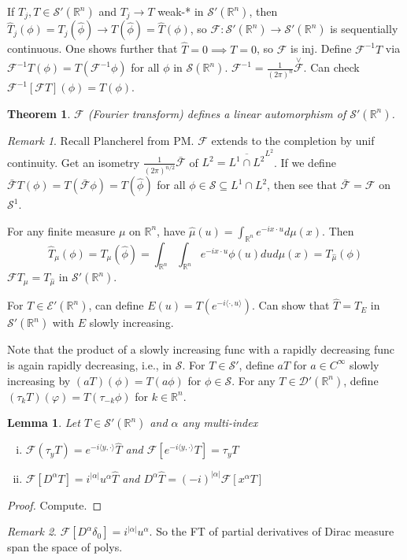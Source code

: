 \documentclass{article}
\theoremstyle{definition}
\theoremstyle{remark}
\newtheorem{rem}{Remark}
\theoremstyle{plain}
\newtheorem{lem}[defn]{Lemma}
\newtheorem{thm}[defn]{Theorem}
\newcommand{\RR}{\mathbb{R}}
\begin{document}
If $T_j, T\in\mathcal S'(\RR^n)$ and $T_j\to T$ weak-* in $\mathcal S'(\RR^n)$, then $\hat T_j(\phi)=T_j(\hat\phi)\to T(\hat\phi)=\hat T(\phi)$, so $\mathcal F:\mathcal S'(\RR^n)\to \mathcal S'(\RR^n)$ is sequentially continuous.
One shows further that $\hat T=0\implies T=0$, so $\mathcal F$ is inj. Define $\mathcal F^{-1}T$ via $\mathcal F^{-1}T(\phi)=T(\mathcal F^{-1}\phi)$ for all $\phi$ in $\mathcal S(\RR^n)$. $\mathcal F^{-1}=\frac{1}{(2\pi)^n}\overset{\vee}{\mathcal F}$. Can check $\mathcal F^{-1}[\mathcal FT](\phi)=T(\phi)$.
\begin{thm}
    $\mathcal F$ (Fourier transform) defines a linear automorphism of $\mathcal S'(\RR^n)$.
\end{thm}
\begin{rem}
    Recall Plancherel from PM. $\mathcal F$ extends to the completion by unif continuity. Get an isometry $\frac{1}{(2\pi)^{n/2}}\bar{\mathcal F}$ of $L^2=\overline{L^1\cap L^2}^{L^2}$. If we define $\bar{\mathcal F}T(\phi)=T(\bar{\mathcal F}\phi)=T(\hat\phi)$ for all $\phi\in\mathcal S\subseteq L^1\cap L^2$, then see that $\bar{\mathcal F}=\mathcal F$ on $\mathcal S^1$.

    For any finite measure $\mu$ on $\RR^n$, have $\hat\mu(u)=\int_{\RR^n}e^{-ix\cdot u}d\mu(x)$. Then
    \[\hat T_\mu(\phi)=T_\mu(\hat\phi)=\int_{\RR^n}\int_{\RR^n}e^{-ix\cdot u}\phi(u)dud\mu(x)=T_{\hat\mu}(\phi)\] $\mathcal FT_\mu=T_{\hat\mu}$ in $\mathcal S'(\RR^n)$.

    For $T\in\mathcal E'(\RR^n)$, can define $E(u)=T(e^{-i\langle\cdot,u\rangle})$. Can show that $\hat T= T_E$ in $\mathcal S'(\RR^n)$ with $E$ slowly increasing.
\end{rem}

Note that the product of a slowly increasing func with a rapidly decreasing func is again rapidly decreasing, i.e., in $\mathcal S$. For $T\in \mathcal S'$, define $aT$ for $a\in C^\infty$ slowly increasing by $(aT)(\phi)=T(a\phi)$ for $\phi\in\mathcal S$. For any $T\in\mathcal D'(\RR^n)$, define $(\tau_kT)(\varphi)=T(\tau_{-k}\phi)$ for $k\in\RR^n$.

\begin{lem}
    Let $T\in\mathcal S'(\RR^n)$ and $\alpha$ any multi-index \begin{enumerate}[(i)]
        \item $\mathcal F(\tau_y T)=e^{-i\langle y,\cdot\rangle}\hat T$ and $\mathcal F[e^{-i\langle y,\cdot\rangle}T]=\tau_y T$
        \item $\mathcal F[D^\alpha T]=i^{|\alpha|}u^\alpha\hat T$ and $D^\alpha\hat T=(-i)^{|\alpha|}\mathcal F[x^\alpha T]$
    \end{enumerate}
\end{lem}
\begin{proof}
    Compute.
\end{proof}
\begin{rem}
    $\mathcal F[D^\alpha\delta_0]=i^{|\alpha|}u^\alpha$. So the FT of partial derivatives of Dirac measure span the space of polys.
\end{rem}
\end{document}
